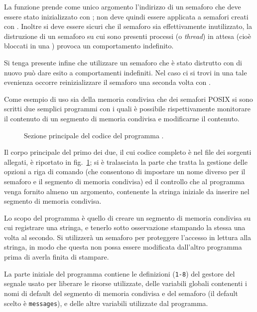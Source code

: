 La funzione prende come unico argomento l'indirizzo di un semaforo che deve
essere stato inizializzato con ; non deve quindi essere
applicata a semafori creati con . Inoltre si deve essere
sicuri che il semaforo sia effettivamente inutilizzato, la distruzione di un
semaforo su cui sono presenti processi (o \textit{thread}) in attesa (cioè
bloccati in una ) provoca un comportamento indefinito.

Si tenga presente infine che utilizzare un semaforo che è stato distrutto con
 di nuovo può dare esito a comportamenti indefiniti.  Nel
caso ci si trovi in una tale evenienza occorre reinizializzare il semaforo una
seconda volta con .

Come esempio di uso sia della memoria condivisa che dei semafori POSIX si sono
scritti due semplici programmi con i quali è possibile rispettivamente
monitorare il contenuto di un segmento di memoria condivisa e modificarne il
contenuto. 

\begin{figure}[!htbp]
  \footnotesize \centering
  \begin{minipage}[c]{\codesamplewidth}
  \end{minipage} 
  \normalsize 
  \caption{Sezione principale del codice del programma
    .}
  \label{fig:ipc_posix_sem_shm_message_server}
\end{figure}

Il corpo principale del primo dei due, il cui codice completo è nel file
 dei sorgenti allegati, è riportato in
fig.~\ref{fig:ipc_posix_sem_shm_message_server}; si è tralasciata la parte che
tratta la gestione delle opzioni a riga di comando (che consentono di
impostare un nome diverso per il semaforo e il segmento di memoria condivisa)
ed il controllo che al programma venga fornito almeno un argomento, contenente
la stringa iniziale da inserire nel segmento di memoria condivisa.

Lo scopo del programma è quello di creare un segmento di memoria condivisa su
cui registrare una stringa, e tenerlo sotto osservazione stampando la stessa
una volta al secondo. Si utilizzerà un semaforo per proteggere l'accesso in
lettura alla stringa, in modo che questa non possa essere modificata
dall'altro programma prima di averla finita di stampare.

La parte iniziale del programma contiene le definizioni (\texttt{\small 1-8})
del gestore del segnale usato per liberare le risorse utilizzate, delle
variabili globali contenenti i nomi di default del segmento di memoria
condivisa e del semaforo (il default scelto è \texttt{messages}), e delle
altre variabili utilizzate dal programma.

